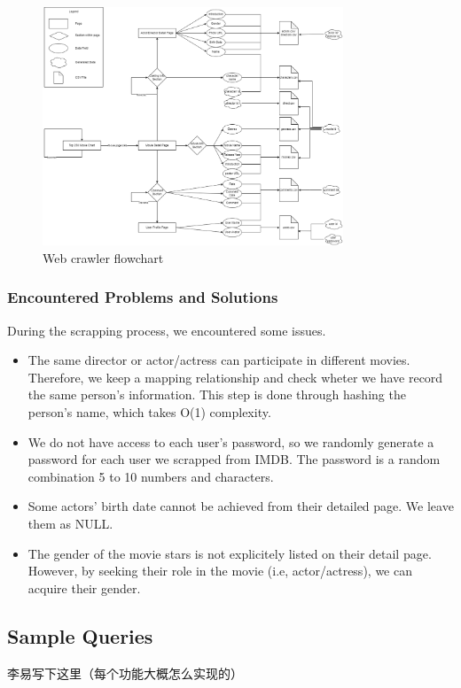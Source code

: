 \begin{CJK*}{UTF8}{gbsn}
\begin{figure}[h]
    \label{crawler}
    \centering
    \includegraphics[width=0.8\textwidth]{crawler_flowchart.png}
    \caption{Web crawler flowchart}
\end{figure}

\subsubsection{Encountered Problems and Solutions}
During the scrapping process, we encountered some issues.
\begin{itemize}
    \item The same director or actor/actress can participate in different movies. Therefore, we keep a mapping relationship and check wheter we have record the same person's information. This step is done through hashing the person's name, which takes O(1) complexity.
    \item We do not have access to each user's password, so we randomly generate a password for each user we scrapped from IMDB. The password is a random combination 5 to 10 numbers and characters.
    \item Some actors' birth date cannot be achieved from their detailed page. We leave them as NULL.
    \item The gender of the movie stars is not explicitely listed on their detail page. However, by seeking their role in the movie (i.e, actor/actress), we can acquire their gender.
\end{itemize}
\subsection{Sample Queries}
李易写下这里（每个功能大概怎么实现的）

\end{CJK*}
